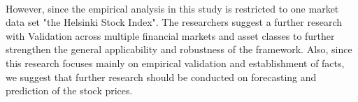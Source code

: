 \documentclass[a4paper,11pt]{amsart}
\theoremstyle{definition}
\theoremstyle{plain}
\theoremstyle{remark}
\newcommand{\1}{\mathbf{1}}
\begin{document}
\paragraph{} However,  since the empirical analysis in this study is restricted to one market data set "the Helsinki Stock Index". The researchers suggest a further research with Validation across multiple financial markets and asset classes to further strengthen the general applicability and robustness of the framework.
Also, since this research focuses mainly on empirical validation and establishment of facts, we suggest that further research should be conducted on forecasting and prediction of the stock prices.



\end{document}
